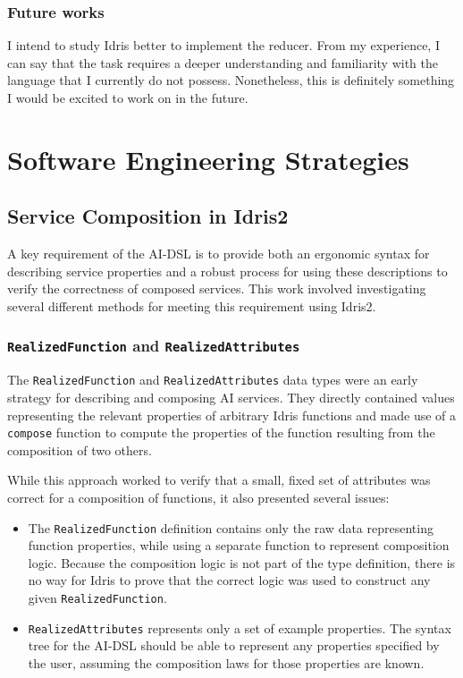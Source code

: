 \documentclass[]{report}
\begin{document}
\subsection{Future works}
I intend to study Idris better to implement the reducer. From my experience, I can say that the task 
requires a deeper understanding and familiarity with the language that I currently do not possess. 
Nonetheless, this is definitely something I would be excited to work on in the future.


\chapter{Software Engineering Strategies}

\section{Service Composition in Idris2}

A key requirement of the AI-DSL is to provide both an ergonomic syntax for
describing service properties and a robust process for using these descriptions
to verify the correctness of composed services.  This work involved
investigating several different methods for meeting this requirement using
Idris2.

\subsection{\texttt{RealizedFunction} and \texttt{RealizedAttributes}}
The \texttt{RealizedFunction} and \texttt{RealizedAttributes} data types were an
early strategy for describing and composing AI services.  They directly
contained values representing the relevant properties of arbitrary Idris
functions and made use of a \texttt{compose} function to compute the properties
of the function resulting from the composition of two others.

While this approach worked to verify that a small, fixed set of attributes was
correct for a composition of functions, it also presented several issues:

\begin{itemize}
  \item
        The \texttt{RealizedFunction} definition contains only the raw data
        representing function properties, while using a separate function to
        represent composition logic.  Because the composition logic is not
        part of the type definition, there is no way for Idris to prove that the
        correct logic was used to construct any given \texttt{RealizedFunction}.


  \item \texttt{RealizedAttributes} represents only a set of example properties.
        The syntax tree for the AI-DSL should be able to represent any
        properties specified by the user, assuming the composition laws for
        those properties are known.


\end{itemize}
\end{document}
